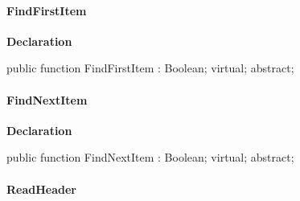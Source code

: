\documentclass{report}
\newif\ifpdf
\begin{document}
\paragraph*{FindFirstItem}\hspace*{\fill}

\label{AbArcTyp.TAbArchiveStreamHelper-FindFirstItem}
\begin{list}{}{
\setlength{\itemindent}{0cm}
\setlength{\listparindent}{0cm}
\setlength{\leftmargin}{\evensidemargin}
\addtolength{\leftmargin}{\tmplength}
\settowidth{\labelsep}{X}
\addtolength{\leftmargin}{\labelsep}
\setlength{\labelwidth}{\tmplength}
}
\item[\textbf{Declaration}\hfill]
\ifpdf
\begin{flushleft}
\fi
\begin{ttfamily}
public function FindFirstItem : Boolean; virtual; abstract;\end{ttfamily}

\ifpdf
\end{flushleft}
\fi

\end{list}
\paragraph*{FindNextItem}\hspace*{\fill}

\label{AbArcTyp.TAbArchiveStreamHelper-FindNextItem}
\begin{list}{}{
\setlength{\itemindent}{0cm}
\setlength{\listparindent}{0cm}
\setlength{\leftmargin}{\evensidemargin}
\addtolength{\leftmargin}{\tmplength}
\settowidth{\labelsep}{X}
\addtolength{\leftmargin}{\labelsep}
\setlength{\labelwidth}{\tmplength}
}
\item[\textbf{Declaration}\hfill]
\ifpdf
\begin{flushleft}
\fi
\begin{ttfamily}
public function FindNextItem : Boolean; virtual; abstract;\end{ttfamily}

\ifpdf
\end{flushleft}
\fi

\end{list}
\paragraph*{ReadHeader}\hspace*{\fill}
\end{document}
